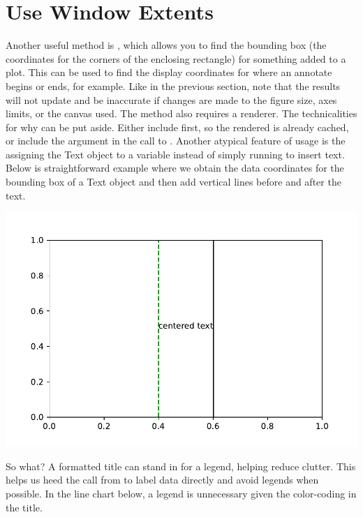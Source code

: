 



\section{Use Window Extents}

Another useful method is , which allows you to find the bounding box (the coordinates for the corners of the enclosing rectangle) for something added to a plot. This can be used to find the display coordinates for where an annotate begins or ends, for example. Like in the previous section, note that the results will not update and be inaccurate if changes are made to the figure size, axes limits, or the canvas used. The method also requires a renderer. The technicalities for why can be put aside. Either include  first, so the rendered is already cached, or include the argument  in the call to . Another atypical feature of  usage is the assigning the Text object to a variable  instead of simply running  to insert text. Below is straightforward example where we obtain the data coordinates for the bounding box of a Text object and then add vertical lines before and after the text.



\begin{center}
    \includegraphics[width = .7\textwidth]{figures/proseplots/window-extent.pdf}
\end{center}

So what? A formatted title can stand in for a legend, helping reduce clutter. This helps us heed the call from \cite{schwabish2021better} to label data directly and avoid legends when possible. In the line chart below, a legend is unnecessary given the color-coding in the title. 


